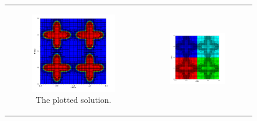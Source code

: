 \begin{figure}
    \centering
    \begin{tabular}{c c}
        \begin{subfigure}[t]{0.45\textwidth}
            \centering
            \includegraphics[width=\textwidth, clip=True, trim={0 0 0 0}]{figures/weak-scaling-stars.png}
            \caption{The plotted solution.}
            \label{subfig:polar-star-solution}
        \end{subfigure}
        &
        \begin{subfigure}[t]{0.45\textwidth}
            \centering
            \includegraphics[width=\textwidth, clip=True, trim={0 0 0 0}]{figures/weak-scaling-partitions.png}

\end{subfigure}
\end{tabular}
\end{figure}
